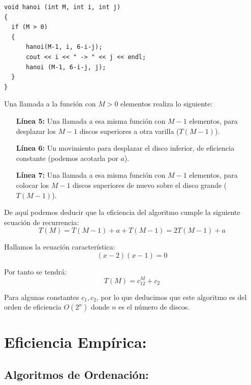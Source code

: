\documentclass{article}
\begin{document}
\begin{lstlisting}
void hanoi (int M, int i, int j)
{
  if (M > 0)
  {
      hanoi(M-1, i, 6-i-j);
      cout << i << " -> " << j << endl;
      hanoi (M-1, 6-i-j, j);
  }
}
\end{lstlisting}

\begin{flushleft}
  Una llamada a la función con $M > 0$ elementos realiza lo siguiente:
  \begin{itemize}
    \item[\textbf{Línea 5:}] Una llamada a esa misma función con $M-1$ elementos, para desplazar
      los $M-1$ discos superiores a otra varilla ($T(M-1)$).

    \item[\textbf{Línea 6:}] Un movimiento para desplazar el disco inferior, de
      eficiencia constante (podemos acotarla por $a$).

    \item[\textbf{Línea 7:}] Una llamada a esa misma función con $M-1$ elementos, para colocar
      los $M-1$ discos superiores de nuevo sobre el disco grande ($T(M-1)$).
  \end{itemize}

  De aquí podemos deducir que la eficiencia del algoritmo cumple la
  siguiente ecuación de recurrencia:
  \[T(M) = T(M-1) + a + T(M-1) = 2T(M-1)+a\]

  Hallamos la ecuación característica:
  \[(x-2)(x-1) = 0\]

  Por tanto se tendrá:
  \[T(M) = c_12^M+c_2\]

  Para algunas constantes $c_1, c_2$, por lo que deducimos que este
  algoritmo es del orden de eficiencia $O(2^n)$ donde $n$ es el número
  de discos.
\end{flushleft}

\section{Eficiencia Empírica:}
\subsection{Algoritmos de Ordenación:}
\end{document}
